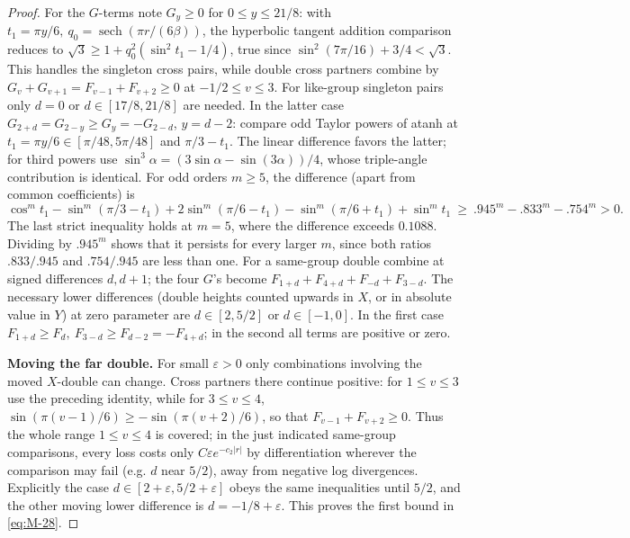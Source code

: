 \begin{proof}
For the \(G\)-terms note \(G_y\ge0\) for \(0\le y\le 21/8\): with \(t_1=\pi y/6,\ q_0=\operatorname{sech}(\pi r/(6\beta))\), the hyperbolic tangent addition comparison reduces to
\(\sqrt3\ge1+q_0^2(\sin^2 t_1-1/4)\), true since \(\sin^2(7\pi/16)+3/4<\sqrt3\). This handles the singleton cross pairs, while double cross partners combine by \(G_v+G_{v+1}=F_{v-1}+F_{v+2}\ge0\) at \(-1/2\le v\le3\). For like-group singleton pairs only \(d=0\) or \(d\in[17/8,21/8]\) are needed. In the latter case \(G_{2+d}=G_{2-y}\ge G_y=-G_{2-d}\), \(y=d-2\): compare odd Taylor powers of atanh at \(t_1=\pi y/6\in[\pi/48,5\pi/48]\) and \(\pi/3-t_1\). The linear difference favors the latter; for third powers use \(\sin^3\alpha=(3\sin\alpha-\sin(3\alpha))/4\), whose triple-angle contribution is identical. For odd orders \(m\ge5\), the difference (apart from common coefficients) is
\[
 \cos^m t_1-\sin^m(\pi/3-t_1)+2\sin^m(\pi/6-t_1)-\sin^m(\pi/6+t_1)+\sin^m t_1
 \ \ge\ .945^m-.833^m-.754^m>0.
\]
The last strict inequality holds at \(m=5\), where the difference exceeds \(0.1088\). Dividing by \(.945^m\) shows that it persists for every larger \(m\), since both ratios \(.833/.945\) and \(.754/.945\) are less than one. For a same-group double combine at signed differences \(d,d+1\); the four \(G\)'s become \(F_{1+d}+F_{4+d}+F_{-d}+F_{3-d}\). The necessary lower differences (double heights counted upwards in \(X\), or in absolute value in \(Y\)) at zero parameter are \(d\in[2,5/2]\) or \(d\in[-1,0]\). In the first case \(F_{1+d}\ge F_d,\ F_{3-d}\ge F_{d-2}=-F_{4+d}\); in the second all terms are positive or zero. 

\par\smallskip\noindent\textbf{Moving the far double.}
For small \(\varepsilon>0\) only combinations involving the moved \(X\)-double can change. Cross partners there continue positive: for \(1\le v\le3\)
use the preceding identity, while for \(3\le v\le4\),
\(\sin(\pi(v-1)/6)\ge-\sin(\pi(v+2)/6)\), so that
\(F_{v-1}+F_{v+2}\ge0\). Thus the whole range \(1\le v\le4\)
is covered; in the just indicated same-group comparisons, every loss costs only \(C\varepsilon e^{-c_2|r|}\) by differentiation wherever the comparison may fail (e.g. \(d\) near \(5/2\)), away from negative log divergences. Explicitly the case \(d\in[2+\varepsilon,5/2+\varepsilon]\) obeys the same inequalities until \(5/2\), and the other moving lower difference is \(d=-1/8+\varepsilon\). This proves the first bound in \eqref{eq:M-28}.


\end{proof}

